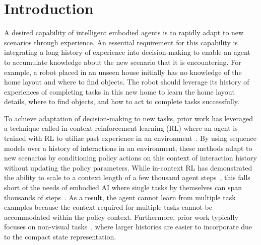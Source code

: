 \section{Introduction}

A desired capability of intelligent embodied agents is to rapidly adapt to new scenarios through experience.
An essential requirement for this capability is integrating a long history of experience into decision-making to enable an agent to accumulate knowledge about the new scenario that it is encountering.
For example, a robot placed in an unseen house initially has no knowledge of the home layout and where to find objects.
The robot should leverage its history of experiences of completing tasks in this new home to learn the home layout details, where to find objects, and how to act to complete tasks successfully.

To achieve adaptation of decision-making to new tasks, prior work has leveraged a technique called in-context reinforcement learning (RL) where an agent is trained with RL to utilize past experience in an environment~\citep{wang2016learning,team2023human,duan2016rl,grigsby2023amago,melo2022transformers}. 
By using sequence models over a history of interactions in an environment, these methods adapt to new scenarios by conditioning policy actions on this context of interaction history without updating the policy parameters.
While in-context RL has demonstrated the ability to scale to a context length of a few thousand 
agent steps~\citep{team2023human,grigsby2023amago}, this falls short of the needs of embodied AI where single tasks by themselves can span thousands of steps~\citep{szot2021habitat}. 
As a result, the agent cannot learn from multiple task examples because the context required for multiple tasks cannot be accommodated within the policy context.
Furthermore, prior work typically focuses on non-visual tasks~\citep{grigsby2023amago,melo2022transformers,ni2023transformers}, where larger histories are easier to incorporate due to the compact state representation.

